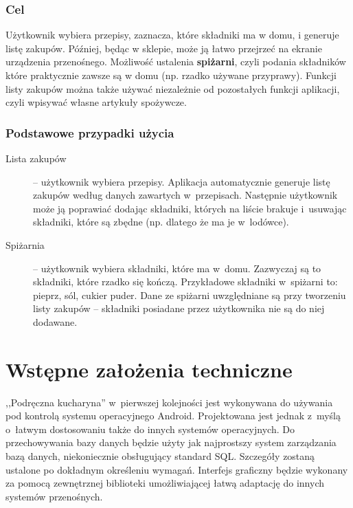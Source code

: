 \documentclass[12pt,leqno, twoside]{mwart}
\begin{document}
\subsubsection{Cel}
Użytkownik wybiera przepisy, zaznacza, które składniki ma w domu, i generuje listę zakupów. Później, będąc w sklepie, może ją łatwo przejrzeć na ekranie urządzenia przenośnego. Możliwość ustalenia \textbf{spiżarni}, czyli podania składników które praktycznie zawsze są w domu (np. rzadko używane przyprawy). Funkcji listy zakupów można także używać niezależnie od pozostałych funkcji aplikacji, czyli wpisywać własne artykuły spożywcze.
\subsubsection{Podstawowe przypadki użycia}
\begin{description}
  \item[Lista zakupów] -- użytkownik wybiera przepisy. Aplikacja automatycznie generuje listę zakupów według danych zawartych w~przepisach. Następnie użytkownik może ją poprawiać dodając składniki, których na liście brakuje i~usuwając składniki, które są zbędne (np. dlatego że ma je w~lodówce).
  \item[Spiżarnia] -- użytkownik wybiera składniki, które ma w~domu. Zazwyczaj są to składniki, które rzadko się kończą. Przykładowe składniki w~spiżarni to: pieprz, sól, cukier puder. Dane ze spiżarni uwzględniane są przy tworzeniu listy zakupów -- składniki posiadane przez użytkownika nie są do niej dodawane.
\end{description}
\section{Wstępne założenia techniczne}
,,Podręczna kucharyna'' w~pierwszej kolejności jest wykonywana do używania pod kontrolą systemu operacyjnego Android. Projektowana jest jednak z~myślą o~łatwym dostosowaniu także do innych systemów operacyjnych.
Do przechowywania bazy danych będzie użyty jak najprostszy system zarządzania bazą danych, niekoniecznie obsługujący standard SQL. Szczegóły zostaną ustalone po dokładnym określeniu wymagań. Interfejs graficzny będzie wykonany za pomocą zewnętrznej biblioteki umożliwiającej łatwą adaptację do innych systemów przenośnych.
\end{document}
